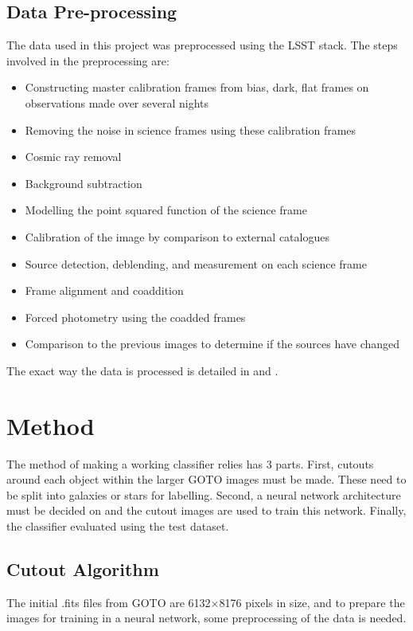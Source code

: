 \documentclass[a4paper,fleqn,usenatbib]{mnras}
\begin{document}
\subsection{Data Pre-processing}
The data used in this project was preprocessed using the LSST stack. The steps involved in the preprocessing are:
\begin{itemize}
\item Constructing master calibration frames from bias, dark, flat frames on observations made over several nights
\item Removing the noise in science frames using these calibration frames
\item Cosmic ray removal
\item Background subtraction
\item Modelling the point squared function of the science frame
\item Calibration of the image by comparison to external catalogues
\item Source detection, deblending, and measurement on each science frame
\item Frame alignment and coaddition
\item Forced photometry using the coadded frames
\item Comparison to the previous images to determine if the sources have changed
\end{itemize}

The exact way the data is processed is detailed in \citet{Hypercam} 
and \citet{GOTOLSST}. 



 \section{Method}
The method of making a working classifier relies has 3 parts. First, cutouts around each object within the larger GOTO images must be made. These need to be split into galaxies or stars for labelling. Second, a neural network architecture must be decided on and the cutout images are used to train this network. Finally, the classifier evaluated using the test dataset.
\subsection{Cutout Algorithm}
The initial .fits files from GOTO are 6132$\times$8176 pixels in size, and to prepare the images for training in a neural network, some preprocessing of the data is needed. 
\end{document}
